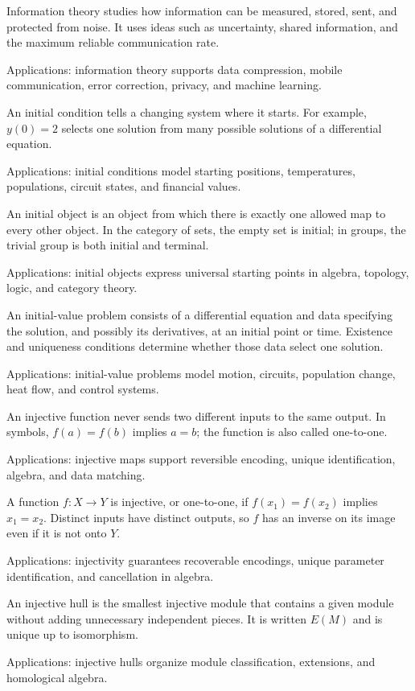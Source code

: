 Information theory studies how information can be measured, stored, sent, and protected from noise. It uses ideas such as uncertainty, shared information, and the maximum reliable communication rate. \par\noindent Applications: information theory supports data compression, mobile communication, error correction, privacy, and machine learning.

An initial condition tells a changing system where it starts. For example, $y(0)=2$ selects one solution from many possible solutions of a differential equation. \par\noindent Applications: initial conditions model starting positions, temperatures, populations, circuit states, and financial values.

An initial object is an object from which there is exactly one allowed map to every other object. In the category of sets, the empty set is initial; in groups, the trivial group is both initial and terminal. \par\noindent Applications: initial objects express universal starting points in algebra, topology, logic, and category theory.

An initial-value problem consists of a differential equation and data specifying the solution, and possibly its derivatives, at an initial point or time. Existence and uniqueness conditions determine whether those data select one solution. \par\noindent Applications: initial-value problems model motion, circuits, population change, heat flow, and control systems.

An injective function never sends two different inputs to the same output. In symbols, $f(a)=f(b)$ implies $a=b$; the function is also called one-to-one. \par\noindent Applications: injective maps support reversible encoding, unique identification, algebra, and data matching.

A function $f:X\to Y$ is injective, or one-to-one, if $f(x_1)=f(x_2)$ implies $x_1=x_2$. Distinct inputs have distinct outputs, so $f$ has an inverse on its image even if it is not onto $Y$. \par\noindent Applications: injectivity guarantees recoverable encodings, unique parameter identification, and cancellation in algebra.

An injective hull is the smallest injective module that contains a given module without adding unnecessary independent pieces. It is written $E(M)$ and is unique up to isomorphism. \par\noindent Applications: injective hulls organize module classification, extensions, and homological algebra.

